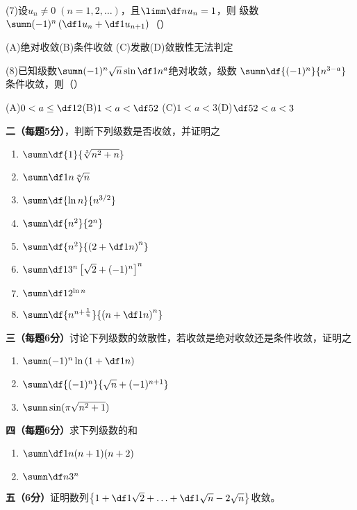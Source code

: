 (7)\;设$u_n\ne0\;(n=1,2,\ldots)$，且$\limn\df n{u_n}=1$，则
级数$\sumn(-1)^n\left(\df1{u_n}+\df1{u_{n+1}}\right)$（\quad）%

\quad (A)\;绝对收敛\quad(B)\;条件收敛
\quad (C)\;发散\quad(D)\;敛散性无法判定

(8)\;已知级数$\sumn(-1)^n\sqrt n\sin\df1{n^a}$绝对收敛，级数
$\sumn\df{(-1)^n}{n^{3-a}}$条件收敛，则（\quad）%

\quad (A)\;$0<a\leq \df12$\quad(B)\;$1<a<\df52$
\quad (C)\;$1<a<3$\quad(D)\;$\df52<a<3$

{\bf 二（每题5分）}，判断下列级数是否收敛，并证明之
\begin{enumerate}[(1)]
  \setlength{\itemindent}{1cm}
  \item $\sumn\df{1}{\sqrt[3]{n^2+n}}$
  \item $\sumn\df1{n\sqrt[n]n}$
  \item $\sumn\df{\ln n}{n^{3/2}}$
  \item $\sumn\df{n^2}{2^n}$
  \item $\sumn\df{n^2}{\left(2+\df1n\right)^n}$
  \item $\sumn\df1{3^n}\left[\sqrt2+(-1)^n\right]^n$
  \item $\sumn\df1{2^{\ln n}}$
  \item $\sumn\df{n^{n+\frac1n}}{\left(n+\df1n\right)^n}$
\end{enumerate}

{\bf 三（每题6分）}讨论下列级数的敛散性，若收敛是绝对收敛还是条件收敛，证明之
\begin{enumerate}[(1)]
  \setlength{\itemindent}{1cm}
  \item $\sumn(-1)^n\ln\left(1+\df1n\right)$
  \item $\sumn\df{(-1)^n}{\sqrt n+(-1)^{n+1}}$
  \item $\sumn\sin(\pi\sqrt{n^2+1})$\quad[提示：已知$\limx{0}\df{\sin x}x=1$]
\end{enumerate}

{\bf 四（每题6分）}求下列级数的和
\begin{enumerate}[(1)]
  \setlength{\itemindent}{1cm}
  \item $\sumn\df1{n(n+1)(n+2)}$
  \item $\sumn\df n{3^n}$
\end{enumerate}

{\bf 五（6分）}证明数列$\left\{1+\df1{\sqrt2}+\ldots
+\df1{\sqrt n}-2\sqrt n\right\}$收敛。

\newpage

